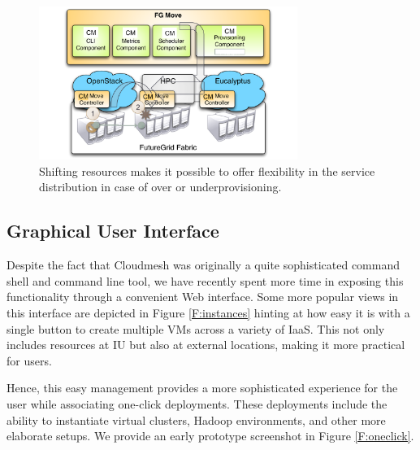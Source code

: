 \documentclass[graybox]{svmult}
\begin{document}
\begin{figure}[htb]
 \centering
   \includegraphics[width=0.75\textwidth]{images/shift2.pdf}
 \caption{Shifting resources makes it possible to offer flexibility
   in the service distribution in case of over or underprovisioning.}\label{F:shift}
\end{figure}

\subsection{Graphical User Interface}

Despite the fact that Cloudmesh was originally a quite sophisticated command shell and command line tool, we have recently spent more time in exposing this functionality through a convenient Web interface. Some more popular views in this interface are depicted in Figure \ref{F:instances} hinting at how easy it is with a single button to create multiple VMs across a variety of IaaS.  This not only includes resources at IU but also at external locations, making it more practical for users. 

Hence, this easy management provides a more sophisticated experience for the user while associating one-click deployments. These deployments include the ability to instantiate virtual clusters, Hadoop environments, and other more elaborate setups.  We provide an early prototype screenshot in Figure \ref{F:oneclick}. 
\end{document}
